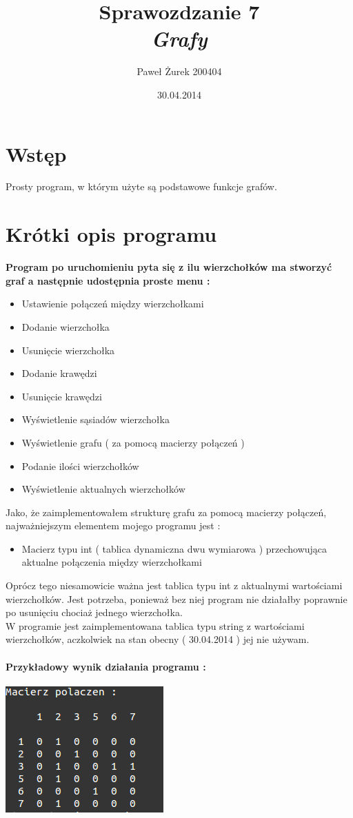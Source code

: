\documentclass[10 pt]{article}
\title{Sprawozdzanie 7 \\ \emph{\textbf{Grafy}}}
\author{Paweł Żurek 200404}
\date{30.04.2014}
\begin{document}
\tableofcontents
\maketitle
\section{Wstęp}
Prosty program, w którym użyte są podstawowe funkcje grafów.
\section{Krótki opis programu}
\textbf{Program po uruchomieniu pyta się z ilu wierzchołków ma stworzyć graf a następnie udostępnia proste menu : }
\begin{itemize}
\item Ustawienie połączeń między wierzchołkami
\item Dodanie wierzchołka
\item Usunięcie wierzchołka
\item Dodanie krawędzi
\item Usunięcie krawędzi
\item Wyświetlenie sąsiadów wierzchołka
\item Wyświetlenie grafu ( za pomocą macierzy połączeń )
\item Podanie ilości wierzchołków
\item Wyświetlenie aktualnych wierzchołków
\end{itemize}
Jako, że zaimplementowałem strukturę grafu za pomocą macierzy połączeń, najważniejszym elementem mojego programu jest : 
\begin{itemize}
\item Macierz typu int ( tablica dynamiczna dwu wymiarowa ) przechowująca aktualne połączenia między wierzchołkami
\end{itemize}
Oprócz tego niesamowicie ważna jest tablica typu int z aktualnymi wartościami wierzchołków. Jest potrzeba, ponieważ bez niej program nie działałby poprawnie po usunięciu chociaż jednego wierzchołka.\\
W programie jest zaimplementowana tablica typu string z wartościami wierzchołków, aczkolwiek na stan obecny ( 30.04.2014 ) jej nie używam.

\paragraph{Przykładowy wynik działania programu : }
\begin{center}
\includegraphics[scale=1]{wynik.png}
\end{center}
\end{document}
